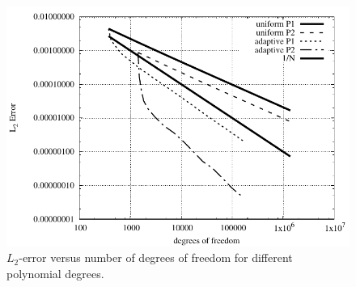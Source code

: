 \documentclass[12pt,a4paper]{article}
\begin{document}
\begin{figure}
\begin{center}
\includegraphics[width=\textwidth]{l2error}
\end{center}
\caption{$L_2$-error versus number of degrees of freedom for different polynomial degrees.}
\label{Fig:L2}
\end{figure}
\end{document}

